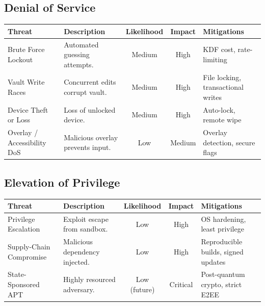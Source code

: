 	\subsection{Denial of Service}
		\begin{center}
			\begin{tabularx}{\textwidth}{>{\raggedright\arraybackslash}p{3cm} | X | c | c | X}
				\toprule
				\textbf{Threat} & \textbf{Description} & \textbf{Likelihood} & \textbf{Impact} & \textbf{Mitigations} \\
				\midrule
				Brute Force Lockout & Automated guessing attempts. & Medium & High & KDF cost, rate-limiting \\
                \midrule
				Vault Write Races & Concurrent edits corrupt vault. & Medium & High & File locking, transactional writes \\
                \midrule
				Device Theft or Loss & Loss of unlocked device. & Medium & High & Auto-lock, remote wipe \\
                \midrule
				Overlay / Accessibility DoS & Malicious overlay prevents input. & Low & Medium & Overlay detection, secure flags \\
				\bottomrule
			\end{tabularx}
		\end{center}
	
	\subsection{Elevation of Privilege}
		\begin{center}
			\begin{tabularx}{\textwidth}{>{\raggedright\arraybackslash}p{3cm} | X | c | c | X}
				\toprule
				\textbf{Threat} & \textbf{Description} & \textbf{Likelihood} & \textbf{Impact} & \textbf{Mitigations} \\
				\midrule
				Privilege Escalation & Exploit escape from sandbox. & Low & High & OS hardening, least privilege \\
                \midrule
				Supply-Chain Compromise & Malicious dependency injected. & Low & High & Reproducible builds, signed updates \\
                \midrule
				State-Sponsored APT & Highly resourced adversary. & Low (future) & Critical & Post-quantum crypto, strict E2EE \\
				\bottomrule
			\end{tabularx}
		\end{center}